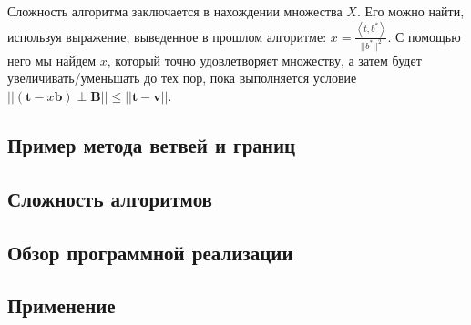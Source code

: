 Сложность алгоритма заключается в нахождении множества $ X $. Его можно найти, используя выражение, выведенное в прошлом алгоритме: $ x = \frac{\left\langle t,b^* \right\rangle}{||b^*||^2} $. С помощью него мы найдем $ x $, который точно удовлетворяет множеству, а затем будет увеличивать/уменьшать до тех пор, пока выполняется условие $ || (\mathbf{t} - x\mathbf{b}) \perp \mathbf{B} || \leq || \mathbf{t} - \mathbf{v} || $.

\subsection{Пример метода ветвей и границ}

\subsection{Сложность алгоритмов}

\subsection{Обзор программной реализации}

\subsection{Применение}

\clearpage